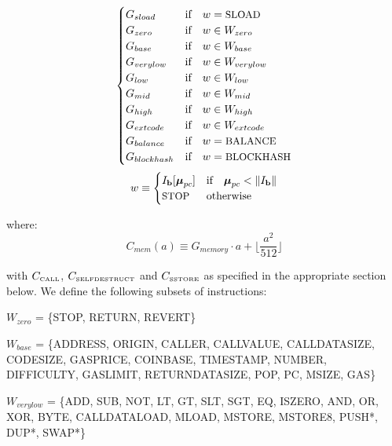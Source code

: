 \documentclass[9pt,oneside]{amsart}
\begin{document}
\begin{equation}
\begin{cases}
G_{sload} & \text{if} \quad w = \text{\small SLOAD}\\
G_{zero} & \text{if} \quad w \in W_{zero}\\
G_{base} & \text{if} \quad w \in W_{base}\\
G_{verylow} & \text{if} \quad w \in W_{verylow}\\
G_{low} & \text{if} \quad w \in W_{low}\\
G_{mid} & \text{if} \quad w \in W_{mid}\\
G_{high} & \text{if} \quad w \in W_{high}\\
G_{extcode} & \text{if} \quad w \in W_{extcode}\\
G_{balance} & \text{if} \quad w = \text{\small BALANCE}\\
G_{blockhash} & \text{if} \quad w = \text{\small BLOCKHASH}\\
\end{cases}
\end{equation}
\begin{equation}
w \equiv \begin{cases} I_{\mathbf{b}}[\boldsymbol{\mu}_{pc}] & \text{if} \quad \boldsymbol{\mu}_{pc} < \lVert I_{\mathbf{b}} \rVert\\
\text{\small STOP} & \text{otherwise}
\end{cases}
\end{equation}

where:
\begin{equation}
C_{mem}(a) \equiv G_{memory} \cdot a + \Big\lfloor \dfrac{a^2}{512} \Big\rfloor
\end{equation}

with $C_\text{\tiny CALL}$, $C_\text{\tiny SELFDESTRUCT}$ and $C_\text{\tiny SSTORE}$ as specified in the appropriate section below. We define the following subsets of instructions:

$W_{zero}$ = \{{\small STOP}, {\small RETURN}, {\small REVERT}\}

$W_{base}$ = \{{\small ADDRESS}, {\small ORIGIN}, {\small CALLER}, {\small CALLVALUE}, {\small CALLDATASIZE}, {\small CODESIZE}, {\small GASPRICE}, {\small COINBASE},\newline \noindent\hspace*{1cm} {\small TIMESTAMP}, {\small NUMBER}, {\small DIFFICULTY}, {\small GASLIMIT}, {\small RETURNDATASIZE}, {\small POP}, {\small PC}, {\small MSIZE}, {\small GAS}\}

$W_{verylow}$ = \{{\small ADD}, {\small SUB}, {\small NOT}, {\small LT}, {\small GT}, {\small SLT}, {\small SGT}, {\small EQ}, {\small ISZERO}, {\small AND}, {\small OR}, {\small XOR}, {\small BYTE}, {\small CALLDATALOAD}, \newline \noindent\hspace*{1cm} {\small MLOAD}, {\small MSTORE}, {\small MSTORE8}, {\small PUSH*}, {\small DUP*}, {\small SWAP*}\}
\end{document}
